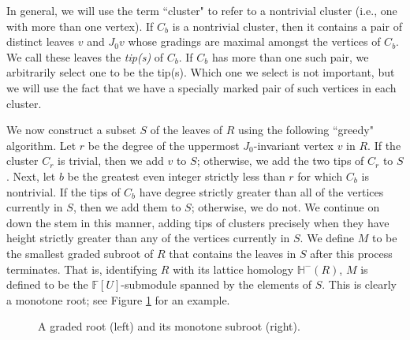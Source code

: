\documentclass[11 pt]{amsart}
\theoremstyle{remark}
\def\ff {{\mathbb{F}}}
\def\He{\mathbb{H}}
\begin{document}
In general, we will use the term ``cluster" to refer to a nontrivial cluster (i.e., one with more than one vertex). If $C_b$ is a nontrivial cluster, then it contains a pair of distinct leaves $v$ and $J_0v$ whose gradings are maximal amongst the vertices of $C_b$. We call these leaves the \textit{tip(s)} of $C_b$. If $C_b$ has more than one such pair, we arbitrarily select one to be the tip(s). Which one we select is not important, but we will use the fact that we have a specially marked pair of such vertices in each cluster. 

We now construct a subset $S$ of the leaves of $R$ using the following ``greedy" algorithm. Let $r$ be the degree of the uppermost $J_0$-invariant vertex $v$ in $R$. If the cluster $C_r$ is trivial, then we add $v$ to $S$; otherwise, we add the two tips of $C_r$ to $S$. Next, let $b$ be the greatest even integer strictly less than $r$ for which $C_b$ is nontrivial. If the tips of $C_b$ have degree strictly greater than all of the vertices currently in $S$, then we add them to $S$; otherwise, we do not. We continue on down the stem in this manner, adding tips of clusters precisely when they have height strictly greater than any of the vertices currently in $S$. We define $M$ to be the smallest graded subroot of $R$ that contains the leaves in $S$ after this process terminates. That is, identifying $R$ with its lattice homology $\He^-(R)$, $M$ is defined to be the $\ff[U]$-submodule spanned by the elements of $S$. This is clearly a monotone root; see Figure \ref{monotonesub} for an example. 

\begin{figure}[h!]
\caption{A graded root (left) and its monotone subroot (right).}\label{monotonesub} 
\end{figure}
\end{document}
